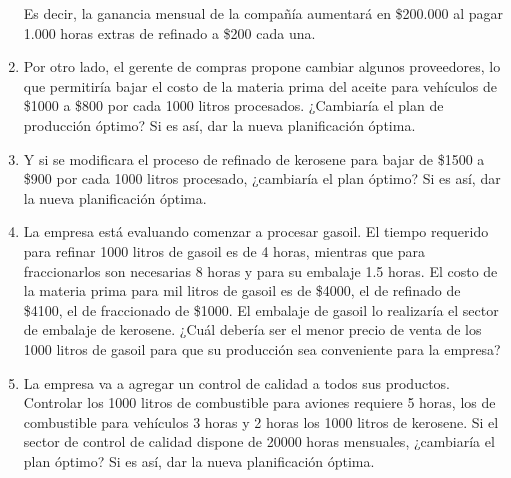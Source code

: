 \documentclass[10pt,a4paper]{article}
\begin{document}
\begin{enumerate}
    Es decir, la ganancia mensual de la compañía aumentará en \$200.000 al pagar 1.000 horas extras de refinado a \$200 cada una.

    \item Por otro lado, el gerente de compras propone cambiar algunos proveedores, lo que permitiría bajar el costo
    de la materia prima del aceite para vehículos de \$1000 a \$800 por cada 1000 litros procesados. ¿Cambiaría el
    plan de producción óptimo? Si es así, dar la nueva planificación óptima.

    \item Y si se modificara el proceso de refinado de kerosene para bajar de \$1500 a \$900 por cada 1000 litros procesado,
    ¿cambiaría el plan óptimo? Si es así, dar la nueva planificación óptima.
    
    \item La empresa está evaluando comenzar a procesar gasoil. El tiempo requerido para refinar 1000 litros de gasoil
    es de 4 horas, mientras que para fraccionarlos son necesarias 8 horas y para su embalaje 1.5 horas. El costo
    de la materia prima para mil litros de gasoil es de \$4000, el de refinado de \$4100, el de fraccionado de \$1000.
    El embalaje de gasoil lo realizaría el sector de embalaje de kerosene. ¿Cuál debería ser el menor precio de
    venta de los 1000 litros de gasoil para que su producción sea conveniente para la empresa?
    
    \item La empresa va a agregar un control de calidad a todos sus productos. Controlar los 1000 litros de combustible
    para aviones requiere 5 horas, los de combustible para vehículos 3 horas y 2 horas los 1000 litros de kerosene.
    Si el sector de control de calidad dispone de 20000 horas mensuales, ¿cambiaría el plan óptimo? Si es así, dar
    la nueva planificación óptima.

\end{enumerate}

\clearpage
\end{document}
